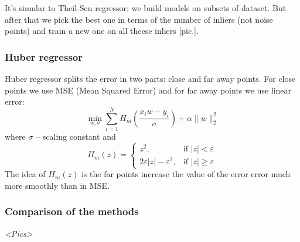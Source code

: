 It's simular to Theil-Sen regressor: we build models on subsets of dataset. But after that we pick the best one in terms of the number of inliers (not noise points) and train a new one on all theese inliers [pic.].

\subsubsection*{Huber regressor} 

Huber regressor splits the error in two parts: close and far away points. For close points we use MSE (Mean Squared Error) and for far away points we use linear error:
$$\min\limits_{w,\sigma}\sum\limits_{i=1}^{N}H_{m}\left(\frac{x_iw-y_i}{\sigma}\right)+\alpha\|w\|_2^2$$
where $\sigma$ -- scaling constant and 
$$H_m(z)=\begin{cases}
	z^2, & \text{if } |z|<\varepsilon \\
	2\varepsilon|z|-\varepsilon^2, & \text{if } |z|\ge\varepsilon
\end{cases}$$
The idea of $H_m(z)$ is the far points increase the value of the error error much more smoothly than in MSE.

\subsubsection*{Comparison of the methods}

{\it <Pics>}